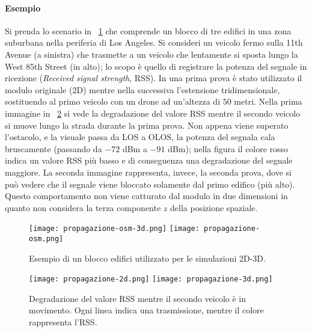 \paragraph{Esempio} Si prenda lo scenario in \figurename~\ref{fig:propagazione-osm}
che comprende un blocco di tre edifici in una zona suburbana nella periferia di Los Angeles.
Si consideri un veicolo fermo sulla 11th Avenue (a sinistra)
che trasmette a un veicolo che lentamente si sposta lungo la West 85th Street (in alto);
lo scopo è quello di registrare la potenza del segnale in ricezione (\textit{Received signal strength}, RSS).
In una prima prova è stato utilizzato il modulo originale ($2$D) mentre nella successiva
l'estensione tridimensionale, sostituendo al primo veicolo con un drone ad un'altezza di $50$ metri.
Nella prima immagine in \figurename~\ref{fig:propagazione-2d-3d} si vede la degradazione del valore RSS
mentre il secondo veicolo si muove lungo la strada durante la prima prova.
Non appena viene superato l'ostacolo, e la visuale passa da LOS a OLOS, la potenza
del segnala cala bruscamente (passando da $-72$ dBm a $-91$ dBm);
nella figura il colore rosso indica un valore RSS più basso e di conseguenza una degradazione del segnale maggiore.
La seconda immagine rappresenta, invece, la seconda prova, dove si può vedere
che il segnale viene bloccato solamente dal primo edifico (più alto).
Questo comportamento non viene catturato dal modulo in due dimensioni
in quanto non considera la terza componente $z$ della posizione spaziale.
%
\begin{figure}[htbp]
	\centering
	\texttt{[image: propagazione-osm-3d.png]}
		\hfill
	\texttt{[image: propagazione-osm.png]}
\caption{Esempio di un blocco edifici utilizzato per le simulazioni 2D-3D.\label{fig:propagazione-osm}}
\end{figure}
%
\begin{figure}[htbp]
	\centering
	\texttt{[image: propagazione-2d.png]}
	\hfill
	\texttt{[image: propagazione-3d.png]}
\caption{Degradazione del valore RSS mentre il secondo veicolo è in movimento.
Ogni linea indica una trasmissione, mentre il colore rappresenta l'RSS.\label{fig:propagazione-2d-3d}}
\end{figure}
%
